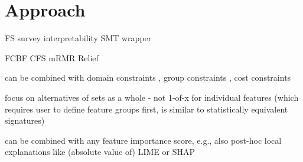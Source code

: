 \section{Approach}
\label{sec:approach}

FS survey \cite{li2017feature, chandrashekar2014survey, guyon2003introduction}
interpretability \cite{carvalho2019machine}
SMT \cite{barrett2018satisfiability}
wrapper \cite{kohavi1997wrappers}

FCBF \cite{yu2003feature}
CFS \cite{hall1999correlation}
mRMR \cite{peng2005feature}
Relief \cite{kira1992feature}

can be combined with domain constraints \cite{groves2015toward}, group constraints \cite{yuan2006model}, cost constraints \cite{paclik2002feature}

focus on alternatives of sets as a whole - not 1-of-x for individual features (which requires user to define feature groups first, is similar to statistically equivalent signatures)

can be combined with any feature importance score, e.g., also post-hoc local explanations like (absolute value of) LIME \cite{ribeiro2016should} or SHAP \cite{lundberg2017unified}
